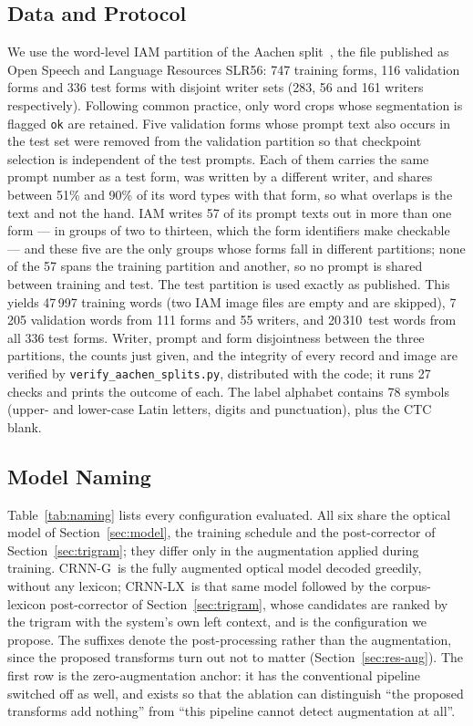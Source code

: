 \documentclass{ws-ijprai}
\newcommand{\ours}{CRNN-LX}            %
\newcommand{\oursnolm}{CRNN-G}         %
\newcommand{\nsamples}{20\,310}
\begin{document}
\subsection{Data and Protocol}
\label{sec:dataset}
We use the word-level IAM partition of the Aachen
split~\cite{aachen_split}, the file published as Open Speech and Language
Resources SLR56: 747 training forms, 116 validation forms
and 336 test forms with disjoint writer sets (283, 56 and 161 writers
respectively). Following common practice, only word crops whose
segmentation is flagged \texttt{ok} are retained. Five validation
forms whose prompt text also occurs in the test set were removed from
the validation partition so that checkpoint selection is independent
of the test prompts. Each of them carries the same prompt number as a test
form, was written by a different writer, and shares between 51\% and
90\% of its word types with that form, so what overlaps is the text and
not the hand. IAM writes 57 of its prompt texts out in more than one
form --- in groups of two to thirteen, which the form identifiers make
checkable --- and these five are the only groups whose forms fall in
different partitions; none of the 57 spans the training partition and
another, so no prompt is shared between training and test. The test
partition is used exactly as published. This yields 47\,997 training words (two IAM image files are
empty and are skipped), 7\,205 validation words from 111 forms and 55
writers, and \nsamples\ test words from all 336 test forms. Writer, prompt
and form disjointness between the three partitions, the counts just given,
and the integrity of every record and image are verified by
\texttt{verify\_aachen\_splits.py}, distributed with the
code; it runs 27 checks and prints the outcome of each. The label alphabet
contains 78 symbols (upper- and lower-case
Latin letters, digits and punctuation), plus the CTC blank.

\subsection{Model Naming}
\label{sec:naming}
Table~\ref{tab:naming} lists every configuration evaluated. All six
share the optical model of Section~\ref{sec:model}, the training
schedule and the post-corrector of Section~\ref{sec:trigram}; they
differ only in the augmentation applied during training. \oursnolm\ is
the fully augmented optical model decoded greedily, without any
lexicon; \ours\ is that same model followed by the corpus-lexicon
post-corrector of Section~\ref{sec:trigram}, whose candidates are ranked by
the trigram with the system's own left context, and is the configuration we
propose. The suffixes denote the
post-processing rather than the augmentation, since the proposed transforms
turn out not to matter (Section~\ref{sec:res-aug}). The first row is
the zero-augmentation anchor: it has the conventional pipeline switched
off as well, and exists so that the ablation can distinguish ``the
proposed transforms add nothing'' from ``this pipeline cannot detect
augmentation at all''.
\end{document}
